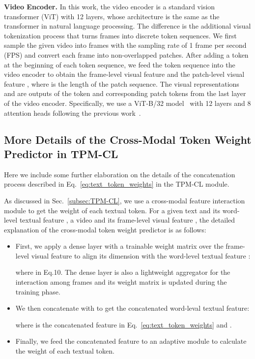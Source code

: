 \documentclass[sigconf]{acmart}
\begin{document}
\textbf{Video Encoder.} 
In this work, the video encoder is a standard vision transformer (ViT) with 12 layers, whose architecture is the same as the transformer in natural language processing. The difference is the additional visual tokenization process that turns frames into discrete token sequences. We first sample the given video  into  frames with the sampling rate of 1 frame per second (FPS) and convert each frame into  non-overlapped patches. After adding a token  at the beginning of each token sequence, we feed the token sequence into the video encoder to obtain the frame-level visual feature  and the patch-level visual feature , where  is the length of the patch sequence. 
The visual representations  and  are outputs of the  token and corresponding patch tokens from the last layer of the video encoder. 
Specifically, we use a ViT-B/32 model~\cite{Dosovitskiy2020AnII} with 12 layers and 8 attention heads following the previous work~\cite{clip4clip2021, ts2net2022, xclip2022}.

\subsection{More Details of the Cross-Modal Token Weight Predictor in TPM-CL}
Here we include some further elaboration on the details of the concatenation process described in Eq.~\ref {eq:text_token_weights} in the TPM-CL module.

As discussed in Sec.~\ref {subsec:TPM-CL}, we use a cross-modal feature interaction module to get the weight of each textual token. For a given text  and its word-level textual feature , a video  and its frame-level visual feature  , the detailed explanation of the cross-modal token weight predictor is as follows:
\begin{itemize}
\label{itm:xwp_detaila}
    \item First, we apply a dense layer with a trainable weight matrix  over the frame-level visual feature  to align its dimension with the word-level textual feature :
    
    where  in Eq.10. The dense layer is also a lightweight aggregator for the interaction among frames and its weight matrix  is updated during the training phase. 
    
    \item We then concatenate  with  to get the concatenated word-leval textual feature:
    
    where  is the concatenated feature in Eq.~\ref{eq:text_token_weights} and .
    
    \item Finally, we feed the concatenated feature  to an adaptive module  to calculate the weight of each textual token.
\end{itemize}
\end{document}
